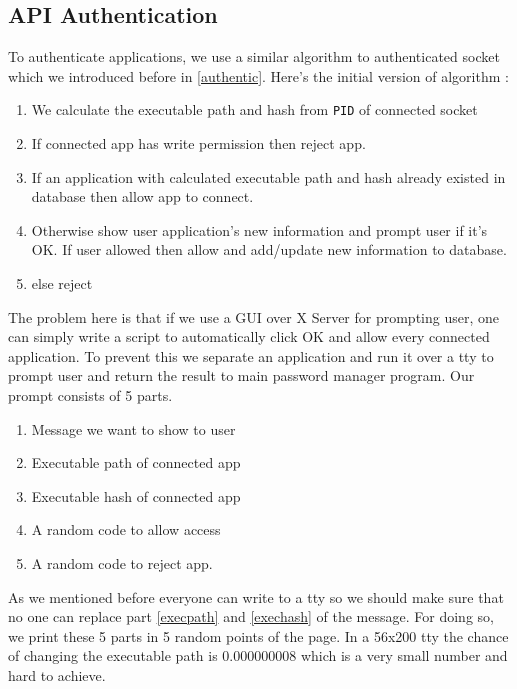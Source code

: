 \documentclass[journal]{IEEEtran}
\begin{document}
\subsection{API Authentication} 

To authenticate applications, we use a similar algorithm to authenticated socket which we introduced before in \ref{authentic}. Here's the initial version of algorithm :

\begin{enumerate}

\item We calculate the executable path and hash from \texttt{PID} of connected socket
\item If connected app has write permission then reject app.
\item If an application with calculated executable path and hash already existed in database then allow app to connect.
\item Otherwise show user application's new information and prompt user if it's OK. If user allowed then allow and add/update new information to database.
\item else reject

\end{enumerate}

The problem here is that if we use a GUI over X Server for prompting user, one can simply write a script to automatically click OK and allow every connected application. To prevent this we separate an application and run it over a tty to prompt user and return the result to main password manager program. Our prompt consists of 5 parts. 


\begin{enumerate}

\item Message we want to show to user
\item Executable path of connected app \label{execpath}
\item Executable hash of connected app \label{exechash}
\item A random code to allow access
\item A random code to reject app.

\end{enumerate}

As we mentioned before everyone can write to a tty so we should make sure that no one can replace part \ref{execpath} and \ref{exechash} of the message. For doing so, we print these 5 parts in 5 random points of the page. In a 56x200 tty the chance of changing the executable path is 0.000000008 which is a very small number and hard to achieve.
\end{document}
